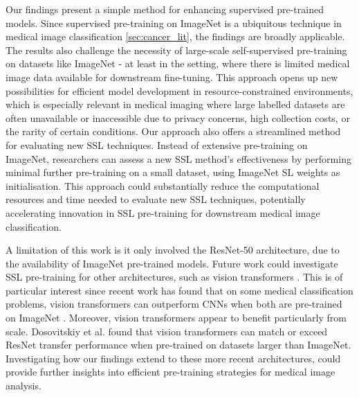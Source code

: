 \documentclass[a4paper,fleqn]{cas-dc}
\begin{document}
Our findings present a simple method for enhancing supervised pre-trained models. Since supervised pre-training on ImageNet is a ubiquitous technique in medical image classification \ref{sec:cancer_lit}, the findings are broadly applicable. The results also challenge the necessity of large-scale self-supervised pre-training on datasets like ImageNet - at least in the setting, where there is limited medical image data available for downstream fine-tuning. This approach opens up new possibilities for efficient model development in resource-constrained environments, which is especially relevant in medical imaging where large labelled datasets are often unavailable or inaccessible due to privacy concerns, high collection costs, or the rarity of certain conditions. Our approach also offers a streamlined method for evaluating new SSL techniques. Instead of extensive pre-training on ImageNet, researchers can assess a new SSL method's effectiveness by performing minimal further pre-training on a small dataset, using ImageNet SL weights as initialisation. This approach could substantially reduce the computational resources and time needed to evaluate new SSL techniques, potentially accelerating innovation in SSL pre-training for downstream medical image classification.

A limitation of this work is it only involved the ResNet-50 architecture, due to the availability of ImageNet pre-trained models. Future work could investigate SSL pre-training for other architectures, such as vision transformers \cite{dosovitskiy2020image}. This is of particular interest since recent work has found that on some medical classification problems, vision transformers can outperform CNNs when both are pre-trained on ImageNet \cite{diagnostics13020178}. Moreover, vision transformers appear to benefit particularly from scale. Dosovitskiy et al. \cite{dosovitskiy2020image} found that vision transformers can match or exceed ResNet transfer performance when pre-trained on datasets larger than ImageNet. Investigating how our findings extend to these more recent architectures, could provide further insights into efficient pre-training strategies for medical image analysis.
\end{document}
